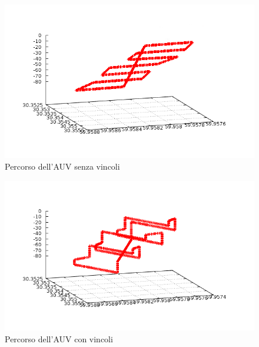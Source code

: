 \begin{figure}[h!]
	\includegraphics[width=\linewidth]{posizioninoscript.png}
	\caption{Percorso dell'AUV senza vincoli}
	\label{fig:}
	\centering
\end{figure}

\begin{figure}[h!]
	\includegraphics[width=\linewidth]{posizioniscript.png}
	\caption{Percorso dell'AUV con vincoli}
	\label{fig:}
	\centering
\end{figure}